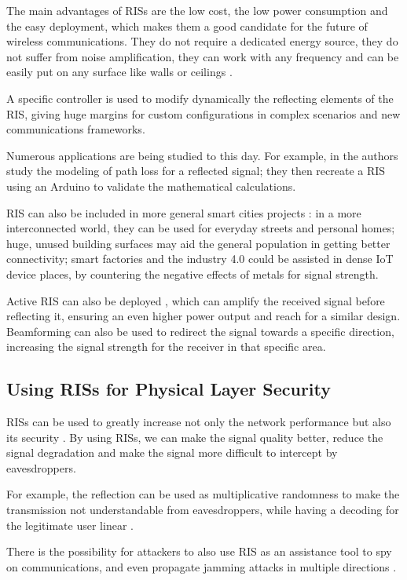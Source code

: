 The main advantages of RISs are the low cost, the low power consumption and the easy deployment, which makes them a good candidate for the future of wireless communications. They do not require a dedicated energy source, they do not suffer from noise amplification, they can work with any frequency and can be easily put on any surface like walls or ceilings \cite{8796365}.

A specific controller is used to modify dynamically the reflecting elements of the RIS, giving huge margins for custom configurations in complex scenarios and new communications frameworks.

Numerous applications are being studied to this day. For example, in \cite{9881509} the authors study the modeling of path loss for a reflected signal; they then recreate a RIS using an Arduino to validate the mathematical calculations.

RIS can also be included in more general smart cities projects \cite{9253607}: in a more interconnected world, they can be used for everyday streets and personal homes; huge, unused building surfaces may aid the general population in getting better connectivity; smart factories and the industry 4.0 could be assisted in dense IoT device places, by countering the negative effects of metals for signal strength.

Active RIS can also be deployed \cite{9377648}, which can amplify the received signal before reflecting it, ensuring an even higher power output and reach for a similar design. Beamforming can also be used to redirect the signal towards a specific direction, increasing the signal strength for the receiver in that specific area.

\subsection{Using RISs for Physical Layer Security}

RISs can be used to greatly increase not only the network performance but also its security \cite{10409564}. By using RISs, we can make the signal quality better, reduce the signal degradation and make the signal more difficult to intercept by eavesdroppers.

For example, the reflection can be used as multiplicative randomness to make the transmission not understandable from eavesdroppers, while having a decoding for the legitimate user linear \cite{9328149}.

There is the possibility for attackers to also use RIS as an assistance tool to spy on communications, and even propagate jamming attacks in multiple directions \cite{10143983}.

